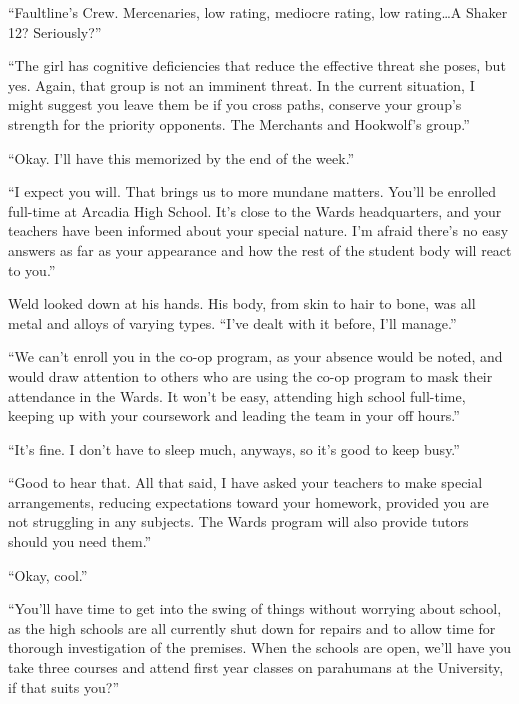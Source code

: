 ``Faultline's Crew.  Mercenaries, low rating, mediocre rating, low rating\ldots  A Shaker 12?  Seriously?''



``The girl has cognitive deficiencies that reduce the effective threat she poses, but yes.  Again, that group is not an imminent threat.  In the current situation, I might suggest you leave them be if you cross paths, conserve your group's strength for the priority opponents.  The Merchants and Hookwolf's group.''



``Okay.  I'll have this memorized by the end of the week.''



``I expect you will.  That brings us to more mundane matters.  You'll be enrolled full-time at Arcadia High School.  It's close to the Wards headquarters, and your teachers have been informed about your special nature.  I'm afraid there's no easy answers as far as your appearance and how the rest of the student body will react to you.''



Weld looked down at his hands.  His body, from skin to hair to bone, was all metal and alloys of varying types.  ``I've dealt with it before, I'll manage.''



``We can't enroll you in the co-op program, as your absence would be noted, and would draw attention to others who are using the co-op program to mask their attendance in the Wards.  It won't be easy, attending high school full-time, keeping up with your coursework and leading the team in your off hours.''



``It's fine.  I don't have to sleep much, anyways, so it's good to keep busy.''



``Good to hear that.  All that said, I have asked your teachers to make special arrangements, reducing expectations toward your homework, provided you are not struggling in any subjects.  The Wards program will also provide tutors should you need them.''



``Okay, cool.''



``You'll have time to get into the swing of things without worrying about school, as the high schools are all currently shut down for repairs and to allow time for thorough investigation of the premises.  When the schools are open, we'll have you take three courses and attend first year classes on parahumans at the University, if that suits you?''



